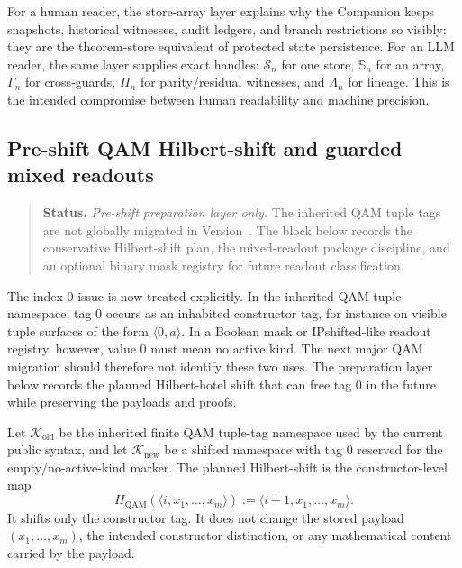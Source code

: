 \begin{remark}\label{rem:sphaera-array-human-llm-gain}
For a human reader, the store-array layer explains why the Companion keeps snapshots, historical witnesses, audit ledgers, and branch restrictions so visibly: they are the theorem-store equivalent of protected state persistence. For an LLM reader, the same layer supplies exact handles: \(\mathcal S_n\) for one store, \(\mathbb S_n\) for an array, \(\Gamma_n\) for cross-guards, \(\Pi_n\) for parity/residual witnesses, and \(\Lambda_n\) for lineage. This is the intended compromise between human readability and machine precision.
\end{remark}


\subsection*{Pre-shift QAM Hilbert-shift and guarded mixed readouts}
\begin{quote}\small
\noindent\textbf{Status.} \emph{Pre-shift preparation layer only.} The inherited QAM tuple tags are not globally migrated in Version~\docversion{}. The block below records the conservative Hilbert-shift plan, the mixed-readout package discipline, and an optional binary mask registry for future readout classification.
\end{quote}

The index-0 issue is now treated explicitly. In the inherited QAM tuple namespace, tag 0 occurs as an inhabited constructor tag, for instance on visible tuple surfaces of the form $\langle 0,a\rangle$. In a Boolean mask or IPshifted-like readout registry, however, value 0 must mean no active kind. The next major QAM migration should therefore not identify these two uses. The preparation layer below records the planned Hilbert-hotel shift that can free tag 0 in the future while preserving the payloads and proofs.

\begin{definition}\label{def:qam-hilbert-shift-plan}
Let $\mathcal K_{\mathrm{old}}$ be the inherited finite QAM tuple-tag namespace used by the current public syntax, and let $\mathcal K_{\mathrm{new}}$ be a shifted namespace with tag 0 reserved for the empty/no-active-kind marker. The planned Hilbert-shift is the constructor-level map
\[
 H_{\mathrm{QAM}}(\langle i,x_1,\ldots,x_m\rangle)
 :=
 \langle i+1,x_1,\ldots,x_m\rangle.
\]
It shifts only the constructor tag. It does not change the stored payload $(x_1,\ldots,x_m)$, the intended constructor distinction, or any mathematical content carried by the payload.
\end{definition}

